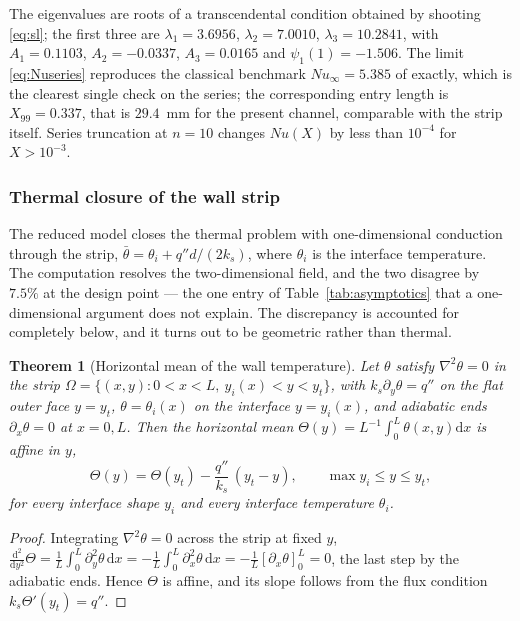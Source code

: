 \documentclass[11pt,a4paper]{article}
\newtheorem{theorem}{Theorem}[section]
\newcommand{\dd}{\mathrm{d}}
\begin{document}
The eigenvalues are roots of a transcendental condition obtained by shooting
\eqref{eq:sl}; the first three are $\lambda_1=3.6956$, $\lambda_2=7.0010$,
$\lambda_3=10.2841$, with $A_1=0.1103$, $A_2=-0.0337$, $A_3=0.0165$ and
$\psi_1(1)=-1.506$. The limit \eqref{eq:Nuseries} reproduces the classical benchmark
$Nu_\infty=5.385$ of \citet{shah1978laminar} exactly, which is the clearest single check on
the series; the corresponding entry length is $X_{99}=0.337$, that is $29.4$~mm for the
present channel, comparable with the strip itself. Series truncation at $n=10$ changes
$Nu(X)$ by less than $10^{-4}$ for $X>10^{-3}$.

\subsubsection{Thermal closure of the wall strip}
\label{sec:wallclosure}

The reduced model closes the thermal problem with one-dimensional conduction through the strip,
$\bar\theta=\theta_i+q''d/(2k_s)$, where $\theta_i$ is the interface temperature. The
computation resolves the two-dimensional field, and the two disagree by $7.5\%$ at the design
point --- the one entry of Table~\ref{tab:asymptotics} that a one-dimensional argument does not
explain. The discrepancy is accounted for completely below, and it turns out to be geometric
rather than thermal.

\begin{theorem}[Horizontal mean of the wall temperature]
\label{thm:wallmean}
Let $\theta$ satisfy $\nabla^2\theta=0$ in the strip
$\Omega=\{(x,y):0<x<L,\ y_i(x)<y<y_t\}$, with $k_s\partial_y\theta=q''$ on the flat outer face
$y=y_t$, $\theta=\theta_i(x)$ on the interface $y=y_i(x)$, and adiabatic ends
$\partial_x\theta=0$ at $x=0,L$. Then the horizontal mean
$\Theta(y)=L^{-1}\int_0^L\theta(x,y)\dd x$ is affine in $y$,
\begin{equation}
\Theta(y)=\Theta(y_t)-\frac{q''}{k_s}\,(y_t-y),\qquad \max y_i\le y\le y_t ,
\label{eq:thetamean}
\end{equation}
for \emph{every} interface shape $y_i$ and \emph{every} interface temperature $\theta_i$.
\end{theorem}

\begin{proof}
Integrating $\nabla^2\theta=0$ across the strip at fixed $y$,
$\frac{\dd^2}{\dd y^2}\Theta=\frac1L\int_0^L\partial_y^2\theta\,\dd x
=-\frac1L\int_0^L\partial_x^2\theta\,\dd x=-\frac1L[\partial_x\theta]_0^L=0$,
the last step by the adiabatic ends. Hence $\Theta$ is affine, and its slope follows from the
flux condition $k_s\Theta'(y_t)=q''$.
\end{proof}
\end{document}

